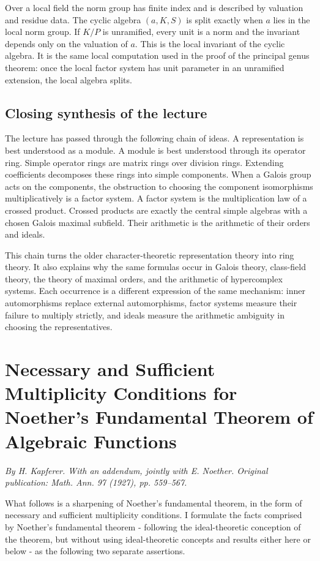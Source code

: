\documentclass[11pt]{article}
\begin{document}
Over a local field the norm group has finite index and is described by valuation and residue data. The cyclic algebra \((a,K,S)\) is split exactly when \(a\) lies in the local norm group. If \(K/P\) is unramified, every unit is a norm and the invariant depends only on the valuation of \(a\). This is the local invariant of the cyclic algebra. It is the same local computation used in the proof of the principal genus theorem: once the local factor system has unit parameter in an unramified extension, the local algebra splits.

\subsection{Closing synthesis of the lecture}

The lecture has passed through the following chain of ideas. A representation is best understood as a module. A module is best understood through its operator ring. Simple operator rings are matrix rings over division rings. Extending coefficients decomposes these rings into simple components. When a Galois group acts on the components, the obstruction to choosing the component isomorphisms multiplicatively is a factor system. A factor system is the multiplication law of a crossed product. Crossed products are exactly the central simple algebras with a chosen Galois maximal subfield. Their arithmetic is the arithmetic of their orders and ideals.

This chain turns the older character-theoretic representation theory into ring theory. It also explains why the same formulas occur in Galois theory, class-field theory, the theory of maximal orders, and the arithmetic of hypercomplex systems. Each occurrence is a different expression of the same mechanism: inner automorphisms replace external automorphisms, factor systems measure their failure to multiply strictly, and ideals measure the arithmetic ambiguity in choosing the representatives.

\section{Necessary and Sufficient Multiplicity Conditions for Noether's Fundamental Theorem of Algebraic Functions}

\textit{By H. Kapferer. With an addendum, jointly with E. Noether. Original publication: Math. Ann. 97 (1927), pp. 559--567.}

What follows is a sharpening of Noether's fundamental theorem, in the form of necessary and sufficient multiplicity conditions. I formulate the facts comprised by Noether's fundamental theorem - following the ideal-theoretic conception of the theorem, but without using ideal-theoretic concepts and results either here or below - as the following two separate assertions.
\end{document}
